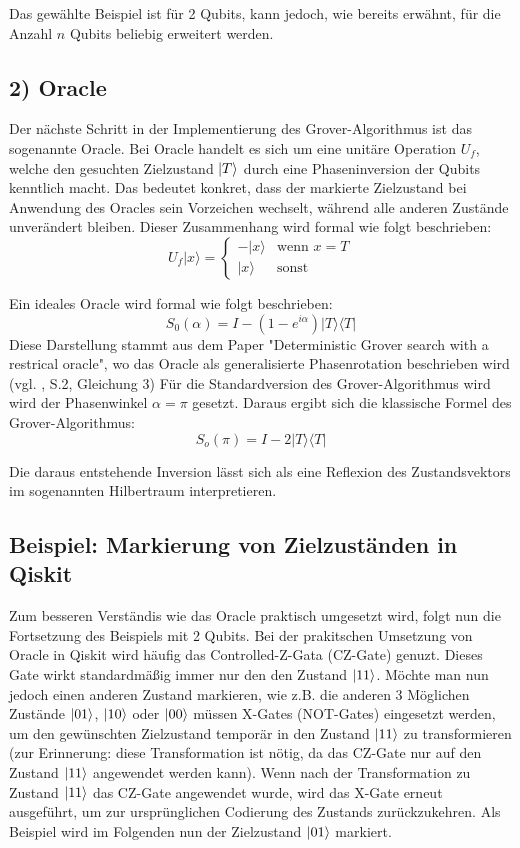 Das gewählte Beispiel ist für 2 Qubits, kann jedoch, wie bereits erwähnt, für die Anzahl $n$ Qubits beliebig erweitert werden.

\subsection*{2) Oracle}
Der nächste Schritt in der Implementierung des Grover-Algorithmus ist das sogenannte Oracle. Bei Oracle handelt es sich um eine unitäre Operation $U_f$, welche den gesuchten Zielzustand $\ket{T}$ durch eine Phaseninversion der Qubits kenntlich macht. Das bedeutet konkret, dass der markierte Zielzustand bei Anwendung des Oracles sein Vorzeichen wechselt, während alle anderen Zustände unverändert bleiben. Dieser Zusammenhang wird formal wie folgt beschrieben: 
$$
U_f|x\rangle = \begin{cases}
    -|x\rangle & \text{wenn } x = T \\
    |x\rangle & \text{sonst}
\end{cases}
$$

Ein ideales Oracle wird formal wie folgt beschrieben:
$$
S_0(\alpha) = I - (1 - e^{i\alpha})|T\rangle\langle T|
$$
Diese Darstellung stammt aus dem Paper "Deterministic Grover search with a restrical oracle", wo das Oracle als generalisierte Phasenrotation beschrieben wird 
(vgl. \citeauthor{roy_deterministic_2022}, \citeyear{roy_deterministic_2022} S.2, Gleichung 3)
Für die Standardversion des Grover-Algorithmus wird wird der Phasenwinkel $\alpha = \pi$ gesetzt. Daraus ergibt sich die klassische Formel des Grover-Algorithmus: 
$$
S_o(\pi) = I - 2|T\rangle\langle T|
$$

Die daraus entstehende Inversion lässt sich als eine Reflexion des Zustandsvektors im sogenannten Hilbertraum interpretieren. 



\subsection*{Beispiel: Markierung von Zielzuständen in Qiskit}
Zum besseren Verständis wie das Oracle praktisch umgesetzt wird, folgt nun die Fortsetzung des Beispiels mit 2 Qubits. Bei der prakitschen Umsetzung von Oracle in Qiskit wird häufig das Controlled-Z-Gata (CZ-Gate) genuzt. Dieses Gate wirkt standardmäßig immer nur den den Zustand $\ket{11}$. Möchte man nun jedoch einen anderen Zustand markieren, wie z.B. die anderen 3 Möglichen Zustände $\ket{01}$, $\ket{10}$ oder $\ket{00}$ müssen X-Gates (NOT-Gates) eingesetzt werden, um den gewünschten Zielzustand temporär in den Zustand $\ket{11}$ zu transformieren (zur Erinnerung: diese Transformation ist nötig, da das CZ-Gate nur auf den Zustand $\ket{11}$ angewendet werden kann). Wenn nach der Transformation zu Zustand $\ket{11}$ das CZ-Gate angewendet wurde, wird das X-Gate erneut ausgeführt, um zur ursprünglichen Codierung des Zustands zurückzukehren.
Als Beispiel wird im Folgenden nun der Zielzustand $\ket{01}$ markiert.


